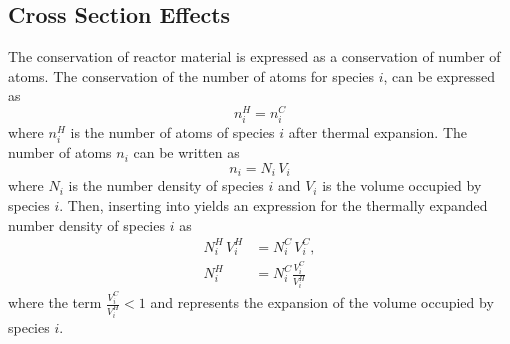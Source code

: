   \subsection{Cross Section Effects}
    \label{sec:cross_section_effects}
    The conservation of reactor material is expressed as a conservation of 
    number of atoms. The conservation of the number of atoms for species $i$, 
    can be expressed as
    \begin{equation}
      \label{eq:conservation}
      n_i^H = n_i^C 
    \end{equation}
    where $n_i^H$ is the number of atoms of species $i$ after thermal expansion.
    The number of atoms $n_i$ can be written as 
    \begin{equation}
      \label{eq:nden_definition}
      n_i = N_i \, V_i
    \end{equation}
    where $N_i$ is the number density of species $i$ and $V_i$ is the volume
    occupied by species $i$. Then, inserting  into 
     yields an expression for the thermally expanded 
    number density of species $i$ as
    \begin{align}
      N_i^H \, V_i^H &= N_i^C \, V_i^C, \\
      \label{eq:nden_volume_ratio}
      N_i^H &= N_i^C \frac{V_i^C}{V_i^H}
    \end{align}
    where the term $\frac{V_i^C}{V_i^H} < 1$ and represents the expansion of the
    volume occupied by species $i$. 

